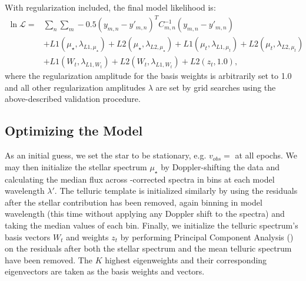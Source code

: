 \documentclass[modern]{aastex62}
\begin{document}
With regularization included, the final model likelihood is:
\begin{equation}
\begin{split}
\ln \mathcal{L} = & \sum_{n} \sum_{m} -0.5 (y_{m,n} - y'_{m,n})^T C_{m,n}^{-1} (y_{m,n}-y'_{m,n})  \\
 & + L1(\mu_{\star}, \lambda_{L1, \mu_{\star}}) + L2(\mu_{\star}, \lambda_{L2, \mu_{\star}}) + L1(\mu_{t},  \lambda_{L1, \mu_{t}}) + L2(\mu_{t},  \lambda_{L2, \mu_{t}}) \\
 & + L1(W_t, \lambda_{L1, W_t}) + L2(W_t, \lambda_{L1, W_t}) + L2(z_t, 1.0) ,
\end{split}
\end{equation}
where the regularization amplitude for the basis weights is arbitrarily set to 1.0 and all other regularization amplitudes $\lambda$ are set by grid searches using the above-described validation procedure. 



\subsection{Optimizing the Model}
\label{s:optimizing}

As an initial guess, we set the star to be stationary, e.g. $v_{obs} = $ \BERV at all epochs.
We may then initialize the stellar spectrum $\mu_{\star}$ by Doppler-shifting the data and calculating the median flux across \BERV-corrected spectra in bins at each model wavelength $\lambda'$.
The telluric template is initialized similarly by using the residuals after the stellar contribution has been removed, again binning in model wavelength (this time without applying any Doppler shift to the spectra) and taking the median values of each bin.
Finally, we initialize the telluric spectrum's basis vectors $W_t$ and weights $z_t$ by performing Principal Component Analysis () on the residuals after both the stellar spectrum and the mean telluric spectrum have been removed.
The $K$ highest eigenweights and their corresponding eigenvectors are taken as the basis weights and vectors.
\end{document}
